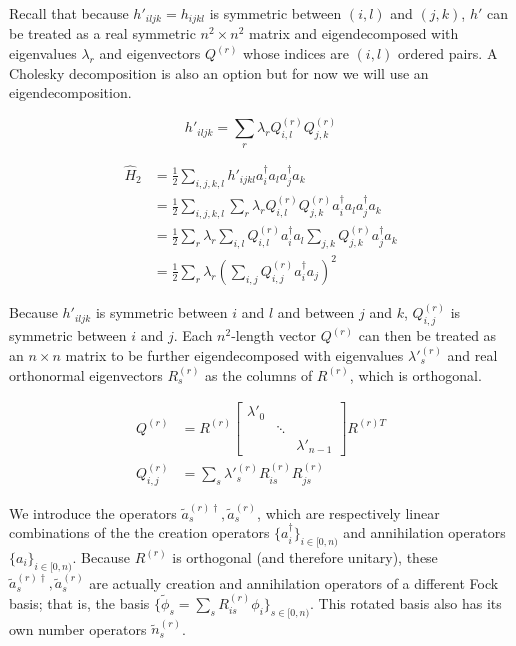 Recall that because $h'_{iljk} = h_{ijkl}$ is symmetric between $(i, l)$ and $(j, k)$, $h'$ can be treated as a real symmetric $n^2 \times n^2$ matrix and eigendecomposed with eigenvalues $\lambda_r$ and eigenvectors $Q^{(r)}$ whose indices are $(i, l)$ ordered pairs. A Cholesky decomposition is also an option but for now we will use an eigendecomposition.

\begin{equation}
    h'_{iljk} = \sum_r \lambda_r Q^{(r)}_{i, l}Q^{(r)}_{j, k}
\end{equation}

\begin{equation}
    \begin{split}
        \hat{H}_2 &= \frac{1}{2}\sum_{i,j,k,l} h'_{ijkl}a^\dag_ia_la^\dag_ja_k \\
        &= \frac{1}{2}\sum_{i,j,k,l} \sum_r \lambda_r Q^{(r)}_{i, l}Q^{(r)}_{j, k}a^\dag_ia_la^\dag_ja_k \\
        &= \frac{1}{2}\sum_r \lambda_r \sum_{i,l} Q^{(r)}_{i, l}a^\dag_ia_l\sum_{j,k}Q^{(r)}_{j, k}a^\dag_ja_k \\
        &= \frac{1}{2}\sum_r\lambda_r\left(\sum_{i,j} Q^{(r)}_{i, j}a^\dag_ia_j\right)^2
    \end{split}
\end{equation}

Because $h'_{iljk}$ is symmetric between $i$ and $l$ and between $j$ and $k$, $Q^{(r)}_{i, j}$ is symmetric between $i$ and $j$. Each $n^2$-length vector $Q^{(r)}$ can then be treated as an $n \times n$ matrix to be further eigendecomposed with eigenvalues $\lambda'^{(r)}_s$ and real orthonormal eigenvectors $R^{(r)}_s$ as the columns of $R^{(r)}$, which is orthogonal.

\begin{equation}
    \begin{split}
        Q^{(r)} &= R^{(r)}\begin{bmatrix}
            \lambda'_0 & & \\ & \ddots & \\ & & \lambda'_{n - 1}
          \end{bmatrix}R^{(r)T} \\
        Q^{(r)}_{i, j} &= \sum_s \lambda'^{(r)}_s R^{(r)}_{is}R^{(r)}_{js}
    \end{split}
\end{equation}

We introduce the operators $\tilde{a}^{(r)\dag}_s, \tilde{a}^{(r)}_s$, which are respectively linear combinations of the the creation operators $\{a^\dag_i\}_{i \in [0, n)}$ and annihilation operators $\{a_i\}_{i \in [0, n)}$. Because $R^{(r)}$ is orthogonal (and therefore unitary), these $\tilde{a}^{(r)\dag}_s, \tilde{a}^{(r)}_s$ are actually creation and annihilation operators of a different Fock basis; that is, the basis $\{\tilde{\phi}_s = \sum_s R^{(r)}_{is} \phi_i\}_{s \in [0, n)}$. This rotated basis also has its own number operators $\tilde{n}^{(r)}_s$.

